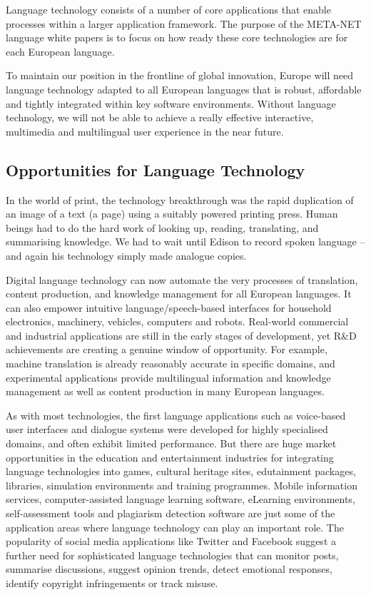 \begin{multicols}{2}
Language technology consists of a number of core applications that enable processes within a larger application framework. The purpose of the META-NET language white papers is to focus on how ready these core technologies are for each European language. 

To maintain our position in the frontline of global innovation, Europe will need language technology adapted to all European languages that is robust, affordable and tightly integrated within key software environments. Without language technology, we will not be able to achieve a really effective interactive, multimedia and multilingual user experience in the near future.


\subsection{Opportunities for Language Technology}


In the world of print, the technology breakthrough was the rapid duplication of an image of a text (a page) using a suitably powered printing press. Human beings had to do the hard work of looking up, reading, translating, and summarising knowledge. We had to wait until Edison to record spoken language – and again his technology simply made analogue copies.

Digital language technology can now automate the very processes of translation, content production, and knowledge management for all European languages. It can also empower intuitive language/speech-based interfaces for household electronics, machinery, vehicles, computers and robots. Real-world commercial and industrial applications are still in the early stages of development, yet R\&D achievements are creating a genuine window of opportunity. For example, machine translation is already reasonably accurate in specific domains, and experimental applications provide multilingual information and knowledge management as well as content production in many European languages. 

As with most technologies, the first language applications such as voice-based user interfaces and dialogue systems were developed for highly specialised domains, and often exhibit limited performance. But there are huge market opportunities in the education and entertainment industries for integrating language technologies into games, cultural heritage sites, edutainment packages, libraries, simulation environments and training programmes. Mobile information services, computer-assisted language learning software, eLearning environments, self-assessment tools and plagiarism detection software are just some of the application areas where language technology can play an important role. The popularity of social media applications like Twitter and Facebook suggest a further need for sophisticated language technologies that can monitor posts, summarise discussions, suggest opinion trends, detect emotional responses, identify copyright infringements or track misuse.


\end{multicols}
